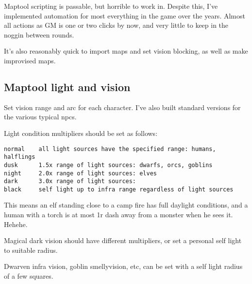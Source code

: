 Maptool scripting is passable, but horrible to work in. Despite this, I've implemented automation for most everything in the game over the years. Almost all actions as GM is one or two clicks by now, and very little to keep in the noggin between rounds.

It's also reasonably quick to import maps and set vision blocking, as well as make improvised maps.


\subsection*{Maptool light and vision}
Set vision range and arc for each character. I've also built standard versions for the various typical npcs.

Light condition multipliers should be set as follows:\\
\small\begin{verbatim}
normal    all light sources have the specified range: humans, halflings
dusk      1.5x range of light sources: dwarfs, orcs, goblins
night     2.0x range of light sources: elves
dark      3.0x range of light sources:
black     self light up to infra range regardless of light sources
\end{verbatim}\normalsize
This means an elf standing close to a camp fire has full daylight conditions, and a human with a torch is at most 1r dash away from a monster when he sees it. Hehehe.

Magical dark vision should have different multipliers, or set a personal self light to suitable radius.

Dwarven infra vision, goblin smellyvision, etc, can be set with a self light radius of a few squares.







